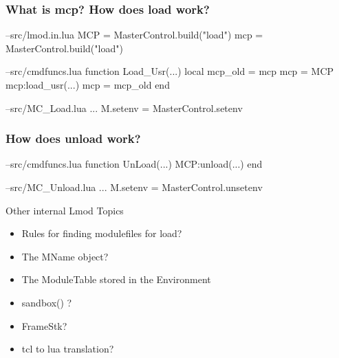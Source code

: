 \documentclass{beamer}
\begin{document}
\begin{frame}[fragile]
  \frametitle{What is mcp? How does load work?}
    {\tiny
\begin{semiverbatim}
--src/lmod.in.lua
   MCP = MasterControl.build("load")
   mcp = MasterControl.build("load")

--src/cmdfuncs.lua
function Load\_Usr(...)
   local mcp\_old = mcp
   mcp = MCP
   mcp:load\_usr(...)
   mcp = mcp\_old
end

--src/MC\_Load.lua
...
M.setenv               = MasterControl.setenv
\end{semiverbatim}
    }
\end{frame}

\begin{frame}[fragile]
  \frametitle{How does unload work?}
    {\tiny
\begin{semiverbatim}
--src/cmdfuncs.lua
function UnLoad(...)
   MCP:unload(...)
end

--src/MC_Unload.lua
...
M.setenv               = MasterControl.unsetenv
\end{semiverbatim}
    }
\end{frame}

\begin{frame}{Other internal Lmod Topics}
  \begin{itemize}
    \item Rules for finding modulefiles for load?
    \item The MName object?
    \item The ModuleTable stored in the Environment
    \item sandbox() ?
    \item FrameStk?
    \item tcl to lua translation?
  \end{itemize}
\end{frame}
\end{document}
